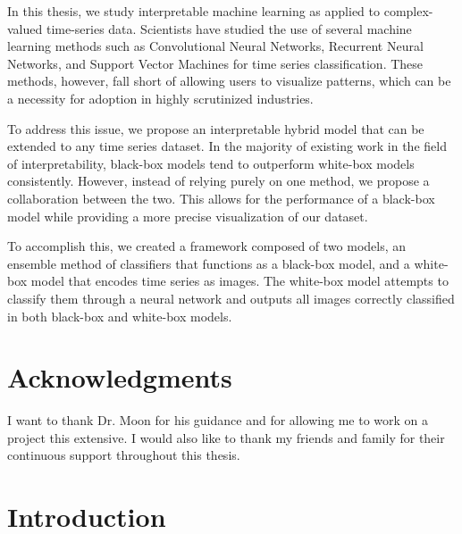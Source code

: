 \documentclass{turabian-thesis}
\begin{document}

In this thesis, we study interpretable machine learning as applied to complex-valued time-series data. Scientists have studied the use of several machine learning methods such as Convolutional Neural Networks, Recurrent Neural Networks, and Support Vector Machines for time series classification. These methods, however, fall short of allowing users to visualize patterns, which can be a necessity for adoption in highly scrutinized industries.

To address this issue, we propose an interpretable hybrid model that can be extended to any time series dataset. In the majority of existing work in the field of interpretability, black-box models tend to outperform white-box models consistently. However, instead of relying purely on one method, we propose a collaboration between the two. This allows for the performance of a black-box model while providing a more precise visualization of our dataset.

To accomplish this, we created a framework composed of two models, an ensemble method of classifiers that functions as a black-box model, and a white-box model that encodes time series as images. The white-box model attempts to classify them through a neural network and outputs all images correctly classified in both black-box and white-box models.

\chapter{Acknowledgments}

I want to thank Dr. Moon for his guidance and for allowing me to work on a project this extensive. I would also like to thank my friends and family for their continuous support throughout this thesis.

\tableofcontents
\listoffigures

\mainmatter
\chapter{Introduction}
\label{chap:introduction}
\end{document}
